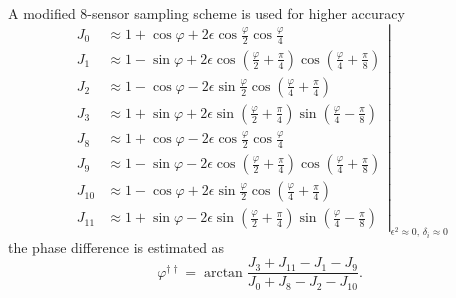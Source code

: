 \documentclass{article}
\begin{document}
A modified 8-sensor sampling scheme is used for higher accuracy
\begin{equation}
  \left .
  \begin{aligned}
  J_0   & \approx 1 + \cos\varphi + 2\epsilon\cos\frac{\varphi}{2}\cos\frac{\varphi}{4} \\
  J_1   & \approx 1 - \sin\varphi + 2\epsilon\cos\left(\frac{\varphi}{2}+\frac{\pi}{4}\right)\cos\left(\frac{\varphi}{4}+\frac{\pi}{8}\right) \\
  J_2   & \approx 1 - \cos\varphi - 2\epsilon\sin\frac{\varphi}{2}\cos\left(\frac{\varphi}{4}+\frac{\pi}{4}\right) \\
  J_3   & \approx 1 + \sin\varphi + 2\epsilon\sin\left(\frac{\varphi}{2}+\frac{\pi}{4}\right)\sin\left(\frac{\varphi}{4}-\frac{\pi}{8}\right) \\
  J_8   & \approx 1 + \cos\varphi - 2\epsilon\cos\frac{\varphi}{2}\cos\frac{\varphi}{4} \\
  J_9   & \approx 1 - \sin\varphi - 2\epsilon\cos\left(\frac{\varphi}{2}+\frac{\pi}{4}\right)\cos\left(\frac{\varphi}{4}+\frac{\pi}{8}\right)\\
  J_{10} & \approx 1 - \cos\varphi + 2\epsilon\sin\frac{\varphi}{2}\cos\left(\frac{\varphi}{4}+\frac{\pi}{4}\right) \\
  J_{11} & \approx 1 + \sin\varphi - 2\epsilon\sin\left(\frac{\varphi}{2}+\frac{\pi}{4}\right)\sin\left(\frac{\varphi}{4}-\frac{\pi}{8}\right)
  \end{aligned} \right\vert_{\epsilon^2 \approx 0\text{, }\delta_i \approx 0}
\end{equation}
the phase difference is estimated as
\begin{equation}
  \varphi^{\dagger\dagger} = \arctan\frac{J_3+J_{11}-J_1-J_9}{J_0+J_8-J_2-J_{10}} \text{.}
\end{equation}
\end{document}
